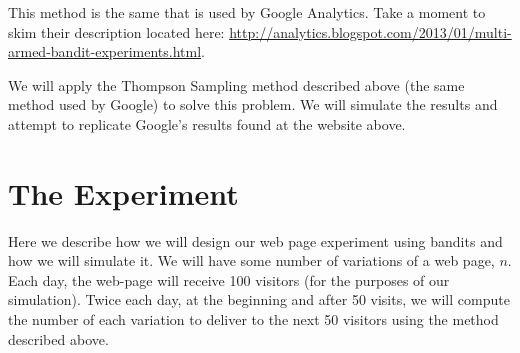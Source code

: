 This method is the same that is used by Google Analytics.  Take a moment to skim their description
located here:
\url{http://analytics.blogspot.com/2013/01/multi-armed-bandit-experiments.html}.

We will apply the Thompson Sampling method described above (the same method
used by Google)
to solve this problem.  We will simulate the results and attempt to replicate Google's results
found at the website above.

\section*{The Experiment}
Here we describe how we will design our web page experiment using bandits and how we will
simulate it.
We will have some number of variations of a web page, $n$.  Each day, the web-page will receive
100 visitors
(for the purposes of our simulation).  Twice each day, at the beginning and after 50 visits,
we will compute the number of each variation to deliver to the next 50 visitors using the
method described above.

